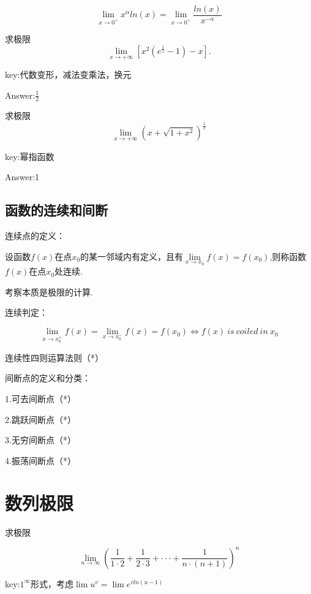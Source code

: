 \documentclass[12pt, a4paper, oneside]{ctexbook}
\begin{document}
\[\lim\limits_{x \to 0^+}x^{\alpha}ln(x)=\lim\limits_{x \to 0^+} \frac{ln(x)}{x^{-\alpha}}\]

\hspace*{\fill}

求极限
\[\lim\limits_{x \to +\infty}[x^2(e^{\frac{1}{x}}-1)-x].\]

key:代数变形，减法变乘法，换元

Answer:$\frac{1}{2}$

\hspace*{\fill}

求极限
\[\lim\limits_{x \to +\infty}(x+\sqrt{1+x^2})^{\frac{1}{x}}\]

key:幂指函数

Answer:1

\section{函数的连续和间断}

连续点的定义：

设函数$f(x)$在点$x_0$的某一邻域内有定义，且有$\lim\limits_{x \to x_0}f(x)=f(x_0)$,则称函数$f(x)$在点$x_0$处连续.

考察本质是极限的计算.

\hspace*{\fill}

连续判定：

\[\lim\limits_{x \to x_0^+}f(x)=\lim\limits_{x \to x_0^-}f(x)=f(x_0) \iff f(x)\ is\ coiled\ in\ x_0\]

\hspace*{\fill}

连续性四则运算法则（*）

\hspace*{\fill}

间断点的定义和分类：

1.可去间断点（*）

2.跳跃间断点（*）

3.无穷间断点（*）

4.振荡间断点（*）

\chapter{数列极限}

求极限

\[\lim\limits_{n \to \infty}(\frac{1}{1\cdot2}+\frac{1}{2\cdot3}+\cdot \cdot \cdot +\frac{1}{n\cdot (n+1)})^n\]

key:$1^{\infty}$形式，考虑$\lim u^v=\lim e^{v ln(u-1)}$
\end{document}
